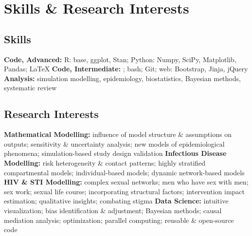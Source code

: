\section{Skills \& Research Interests}\nodate
\subsection{Skills}
\bullet \textbf{Code, Advanced:} R: base, ggplot, Stan; Python: Numpy, SciPy, Matplotlib, Pandas; \LaTeX
\bullet \textbf{Code, Intermediate:} \matlab; bash; Git; web: Bootstrap, Jinja, jQuery
\bullet \textbf{Analysis:} simulation modelling, epidemiology, biostatistics, Bayesian methods, systematic review
\subsection{Research Interests}\nodate
\bullet \textbf{Mathematical Modelling:}
        influence of model structure \& assumptions on outputs;
        sensitivity \& uncertainty analysis;
        new models of epidemiological phenomena;
        simulation-based study design validation
\bullet \textbf{Infectious Disease Modelling:}
        risk heterogeneity \& contact patterns;
        highly stratified compartmental models;
        individual-based models;
        dynamic network-based models
\bullet \textbf{HIV \& STI Modelling:}
        complex sexual networks;
        men who have sex with men;
        sex work;
        sexual life course;
        incorporating structural factors;
        intervention impact estimation;
        qualitative insights;
        combating stigma
\bullet \textbf{Data Science:}
        intuitive visualization;
        bias identification \& adjustment;
        Bayesian methods;
        causal mediation analysis;
        optimization;
        parallel computing;
        reusable \& open-source code
